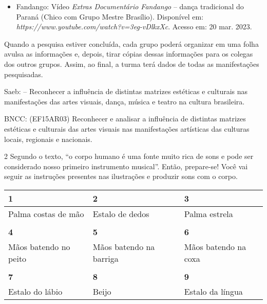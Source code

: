 {\begin{itemize}
\item Fandango: Vídeo \emph{Extras Documentário Fandango} -- dança tradicional
do Paraná (Chico com Grupo Mestre Brasílio). Disponível em: \emph{https://www.youtube.com/watch?v=3eg-vDlkxXc}. Acesso em: 20 mar. 2023.
\end{itemize}

Quando a pesquisa estiver concluída, cada grupo poderá organizar em uma
folha avulsa as informações e, depois, tirar cópias dessas informações
para os colegas dos outros grupos. Assim, ao final, a turma terá dados
de todas as manifestações pesquisadas.

Saeb: -- Reconhecer a influência de distintas matrizes estéticas e
culturais nas manifestações das artes visuais, dança, música e teatro na
cultura brasileira.

BNCC: (EF15AR03) Reconhecer e analisar a influência de distintas
matrizes estéticas e culturais das artes visuais nas manifestações
artísticas das culturas locais, regionais e nacionais.}

\num{2}  Segundo o texto, ``o corpo humano é uma fonte muito rica de sons e
  pode ser considerado nosso primeiro instrumento musical''. Então,
  prepare-se! Você vai seguir as instruções presentes nas ilustrações e
  produzir sons com o corpo.


\begin{longtable}[]{@{}lll@{}}
\toprule
\textbf{1} & \textbf{2} & \textbf{3}\tabularnewline
\midrule
\endhead
Palma costas de mão & Estalo de dedos & Palma estrela\tabularnewline
& &\tabularnewline
\textbf{4} & \textbf{5} & \textbf{6}\tabularnewline
Mãos batendo no peito & Mãos batendo na barriga & Mãos batendo na
coxa\tabularnewline
& &\tabularnewline
\textbf{7} & \textbf{8} & \textbf{9}\tabularnewline
Estalo do lábio & Beijo & Estalo da língua\tabularnewline
\bottomrule
\end{longtable}


